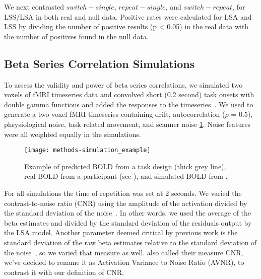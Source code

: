 \documentclass[10pt,letterpaper]{article}
\begin{document}
We next contrasted $switch - single$, $repeat - single$, and $switch - repeat$, for LSS/LSA in both
real and null data.
Positive rates were calculated for LSA and LSS by dividing the number of positive results (p < 0.05)
in the real data with the number of positives found in the null data.

\subsection*{Beta Series Correlation Simulations}
\label{methods:bsc-simulations}

To assess the validity and power of beta series correlations,
we simulated two voxels of fMRI timeseries data and convolved short (0.2 second)
task onsets with double gamma functions
and added the responses to the timeseries~\cite{Glover1999,Welvaert2011}.
We used \cite[fmrisim from the brainiak toolbox]{Ellis2020} to generate a
two voxel fMRI timeseries containing drift, autocorrelation ($\rho$ = 0.5), phsysiological noise,
task related movement, and scanner noise \ref{fig:simulation_example}.
Noise features were all weighted equally in the simulations.

\begin{figure}[H]
  \centering
  \texttt{[image: methods-simulation\_example]}
  \caption{
    Example of predicted BOLD from a task design (thick grey line), real BOLD
    from a participant (see ), and simulated BOLD
    from \cite[fmrisim]{Ellis2020}.
  }
  \label{fig:simulation_example}
\end{figure}

For all simulations the time of repetition was set at 2 seconds.
We varied the contrast-to-noise ratio (CNR) using the amplitude of the activation
divided by the standard deviation of the noise~\cite{Welvaert2013a}.
In other words, we used the average of the beta estimates and divided by the standard
deviation of the residuals output by the LSA model.
Another parameter deemed critical by previous work is the standard deviation
of the raw beta estimates relative to the standard deviation of the noise~\cite{Abdulrahman2016},
so we varied that measure as well.
\cite[Since Abdulrahman \& Henson (2016)]{Abdulrahman2016} also called their measure
CNR, we've decided to rename it as Activation Variance to Noise Ratio (AVNR), to
contrast it with our definition of CNR.
\end{document}
